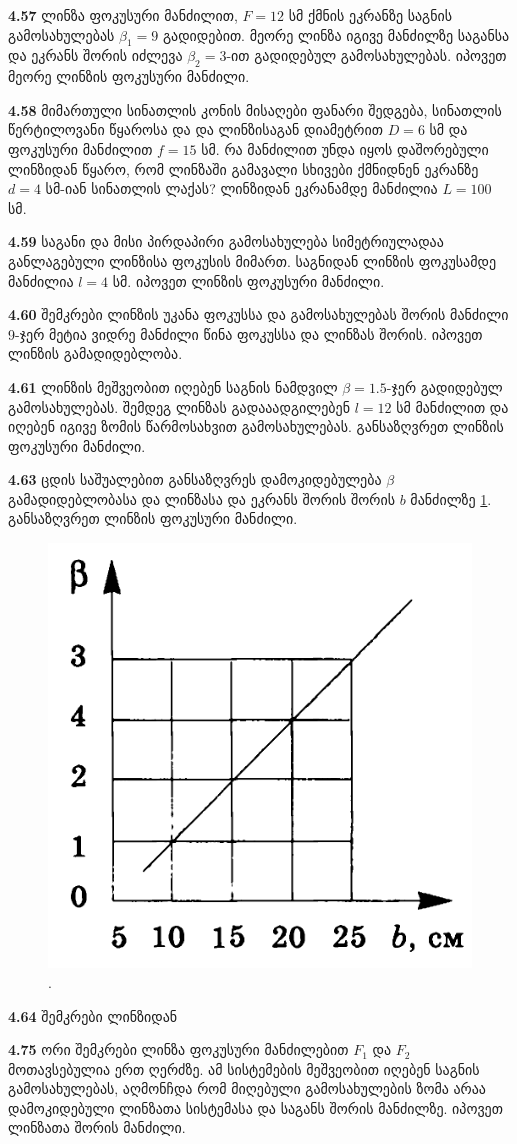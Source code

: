 \documentclass[a4paper]{book}
\begin{document}
\textbf{4.57} ლინზა ფოკუსური მანძილით, $F = 12$ სმ ქმნის ეკრანზე საგნის გამოსახულებას $\beta_1 = 9$ გადიდებით. მეორე ლინზა იგივე მანძილზე საგანსა და ეკრანს შორის იძლევა $\beta_2 = 3$-ით გადიდებულ გამოსახულებას. იპოვეთ მეორე ლინზის ფოკუსური მანძილი.

\textbf{4.58} მიმართული სინათლის კონის მისაღები ფანარი შედგება, სინათლის წერტილოვანი წყაროსა და და ლინზისაგან დიამეტრით $D = 6$ სმ და ფოკუსური მანძილით $f = 15$  სმ. რა მანძილით უნდა იყოს დაშორებული ლინზიდან წყარო, რომ ლინზაში გამავალი სხივები ქმნიდნენ ეკრანზე $d = 4$ სმ-იან სინათლის ლაქას? ლინზიდან ეკრანამდე მანძილია $L = 100$ სმ.

\textbf{4.59} საგანი და მისი პირდაპირი გამოსახულება სიმეტრიულადაა განლაგებული ლინზისა ფოკუსის მიმართ. საგნიდან ლინზის ფოკუსამდე მანძილია $l = 4$ სმ. იპოვეთ ლინზის ფოკუსური მანძილი.

\textbf{4.60} შემკრები ლინზის უკანა ფოკუსსა და გამოსახულებას შორის მანძილი 9-ჯერ მეტია ვიდრე მანძილი წინა ფოკუსსა და ლინზას შორის. იპოვეთ ლინზის გამადიდებლობა.
       
\textbf{4.61} ლინზის მეშვეობით იღებენ საგნის ნამდვილ $\beta = 1.5$-ჯერ გადიდებულ გამოსახულებას. შემდეგ ლინზას გადააადგილებენ $l = 12$ სმ მანძილით და იღებენ იგივე ზომის წარმოსახვით გამოსახულებას. განსაზღვრეთ ლინზის ფოკუსური მანძილი.

\textbf{4.63} ცდის საშუალებით განსაზღვრეს დამოკიდებულება $\beta$ გამადიდებლობასა და ლინზასა და ეკრანს შორის შორის $b$ მანძილზე \ref{fig:4_63}. განსაზღვრეთ ლინზის ფოკუსური მანძილი.
	\begin{figure}[h]
		   \centering
           \includegraphics[width=0.4\columnwidth]{figures/4_63}
           \caption{.}
           \label{fig:4_63}
        \end{figure}

\textbf{4.64} შემკრები ლინზიდან

\textbf{4.75} ორი შემკრები ლინზა ფოკუსური მანძილებით $F_1$ და $F_2$ მოთავსებულია ერთ ღერძზე. ამ სისტემების მეშვეობით იღებენ საგნის გამოსახულებას, აღმონჩდა რომ მიღებული გამოსახულების ზომა არაა დამოკიდებული ლინზათა სისტემასა და საგანს შორის მანძილზე. იპოვეთ ლინზათა შორის მანძილი. 
\end{document}
